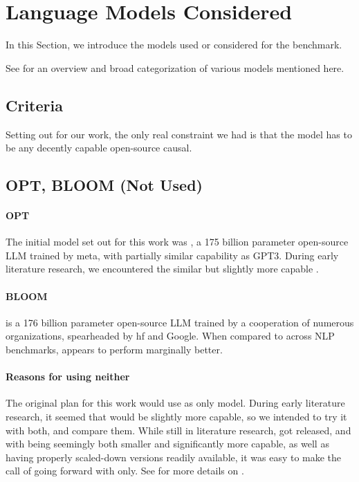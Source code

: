 \section{Language Models Considered}\label{sec:models}
In this Section, we introduce the models used or considered for the benchmark.

See  for an overview and broad categorization of various models mentioned here.

\subsection{Criteria}\label{sub:criteria}
Setting out for our work, the only real constraint we had is that the model has to be any decently capable open-source \gls{causal}.

\subsection{OPT, BLOOM (Not Used)}
\paragraph{OPT}\label{par:opt}\label{sub:OPT}
The initial model set out for this work was  \cite{zhang_opt_2022}, a 175 billion parameter open-source \gls{LLM} trained by \gls{meta}, with partially similar capability as \gls{GPT3}. During early literature research, we encountered the similar but slightly more capable .

\paragraph{BLOOM}\label{par:bloom}\label{sub:BLOOM}
 \cite{workshop_bloom_2022} is a 176 billion parameter open-source \gls{LLM} trained by a cooperation of numerous organizations, spearheaded by \gls{hf} and \gls{Google}. When compared to  across \gls{NLP} benchmarks,  appears to perform marginally better.

\paragraph{Reasons for using neither}
The original plan for this work would use  as only model. During early literature research, it seemed that  would be slightly more capable, so we intended to try it with both, and compare them. 
While still in literature research,  got released, and with being seemingly both smaller and significantly more capable, as well as having properly scaled-down versions readily available, it was easy to make the call of going forward with  only. 
See  for more details on .


